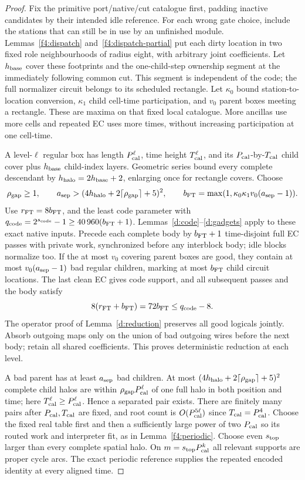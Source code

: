 \begin{proof}
Fix the primitive port/native/cut catalogue first, padding inactive
candidates by their intended idle reference. For each wrong gate choice, include the stations that can still be in use by an unfinished module. Lemmas~\ref{f4:dispatch}
and~\ref{f4:dispatch-partial} put each dirty location in two fixed
role neighbourhoods of radius eight, with arbitrary joint coefficients.
Let \(h_{\rm base}\) cover these footprints and the one-child-step ownership
segment at the immediately following common cut. This segment is
independent of the code; the full normalizer circuit belongs to its
scheduled rectangle. Let \(\kappa_0\) bound station-to-location
conversion, \(\kappa_1\) child cell-time participation, and \(v_0\)
parent boxes meeting a rectangle. These are maxima on that fixed
local catalogue. More ancillas use more cells and repeated EC uses
more times, without increasing participation at one cell-time.

A level-\(\ell\) regular box has length \(P_{\rm cal}^\ell\), time height
\(T_{\rm cal}^\ell\), and its \(P_{\rm cal}\)-by-\(T_{\rm cal}\) child cover plus \(h_{\rm base}\)
child-index layers. Geometric series bound every complete descendant
by \mbox{\(h_{\rm halo}=2h_{\rm base}+2\)}, enlarging once for rectangle covers. Choose
\[
 \rho_{\rm gap}\ge1,\qquad
 a_{\rm sep}>(4h_{\rm halo}+2\lceil\rho_{\rm gap}\rceil+5)^2,\qquad
 b_{\rm FT}=\max(1,\kappa_0\kappa_1v_0(a_{\rm sep}-1)).
\]
Use \(r_{\rm FT}=8b_{\rm FT}\), and the least code
parameter with \(q_{\rm code}=2^{s_{\rm code}}-1
\ge40\,960(b_{\rm FT}+1)\). Lemmas~\ref{d:code}--\ref{d:gadgets}
apply to these exact native inputs. Precede each complete body by
\(b_{\rm FT}+1\) time-disjoint full EC passes with private work,
synchronized before any interblock body; idle blocks normalize too.
If the at most \(v_0\) covering parent boxes are good, they contain
at most \(v_0(a_{\rm sep}-1)\) bad regular children, marking at most
\(b_{\rm FT}\) child circuit locations. The last clean EC gives
code support, and all subsequent passes and the body satisfy
\[
 8(r_{\rm FT}+b_{\rm FT})=72b_{\rm FT}\le q_{\rm code}-8.
\]
The operator proof of Lemma~\ref{d:reduction} preserves all
good logicals jointly. Absorb outgoing maps only on the union of bad
outgoing wires before the next body; retain all shared coefficients.
This proves deterministic reduction at each level.

A bad parent has at least \(a_{\rm sep}\) bad children. At most
\((4h_{\rm halo}+2\lceil\rho_{\rm gap}\rceil+5)^2\) complete child halos are
within \(\rho_{\rm gap}P_{\rm cal}^\ell\) of one full halo in both position
and time; here \(T_{\rm cal}^\ell\ge P_{\rm cal}^\ell\). Hence a separated pair exists.
There are finitely many pairs after \(P_{\rm cal},T_{\rm cal}\) are fixed, and root count
is \(O(P_{\rm cal}^{5\ell})\) since \(T_{\rm cal}=P_{\rm cal}^4\). Choose the fixed real table
first and then a sufficiently large power of two \(P_{\rm cal}\) so its routed
work and interpreter fit, as in Lemma~\ref{f4:periodic}. Choose even
\(s_{\rm top}\) larger than every complete spatial halo. On
\(m=s_{\rm top}P_{\rm cal}^k\) all relevant supports are proper cycle arcs.
The exact periodic reference supplies the repeated encoded identity
at every aligned time.


\end{proof}
